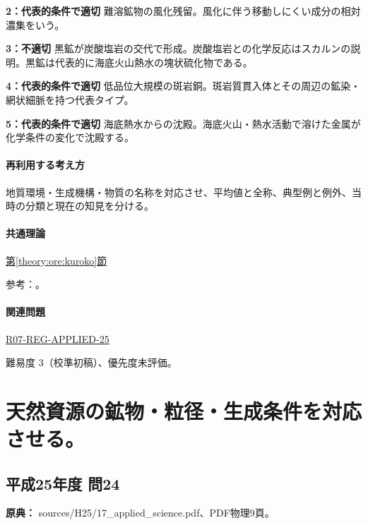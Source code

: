 \noindent\textbf{2：代表的条件で適切} 難溶鉱物の風化残留。風化に伴う移動しにくい成分の相対濃集をいう。\par

\noindent\textbf{3：不適切} 黒鉱が炭酸塩岩の交代で形成。炭酸塩岩との化学反応はスカルンの説明。黒鉱は代表的に海底火山熱水の塊状硫化物である。\par

\noindent\textbf{4：代表的条件で適切} 低品位大規模の斑岩銅。斑岩質貫入体とその周辺の鉱染・網状細脈を持つ代表タイプ。\par

\noindent\textbf{5：代表的条件で適切} 海底熱水からの沈殿。海底火山・熱水活動で溶けた金属が化学条件の変化で沈殿する。\par

\paragraph{再利用する考え方} 地質環境・生成機構・物質の名称を対応させ、平均値と全称、典型例と例外、当時の分類と現在の知見を分ける。

\paragraph{共通理論} \hyperref[theory:ore:kuroko]{第\ref*{theory:ore:kuroko}節}

\par 参考：\cite{ore50_kuroko_ref,ore50_porphyry_ref,ore50_bauxite_ref}。

\paragraph{関連問題} \hyperref[q:r07-reg-applied-25]{R07-REG-APPLIED-25}

\par 難易度 3（校準初稿）、優先度未評価。

\section{天然資源の鉱物・粒径・生成条件を対応させる。}

\subsection{平成25年度 問24}
\label{q:h25-reg-applied-24}

\noindent\textbf{原典：} sources/H25/17\_applied\_science.pdf、PDF物理9頁。

